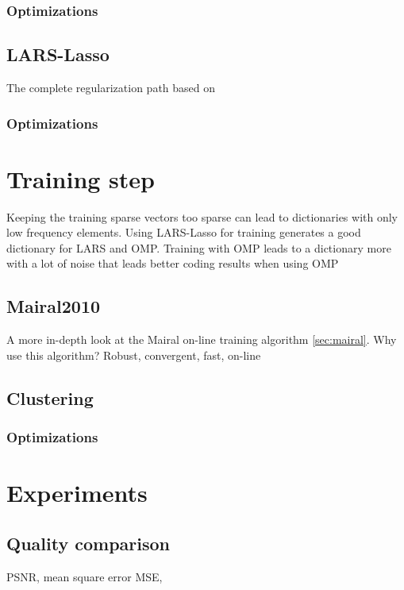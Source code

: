 \subsubsection*{Optimizations}


\subsection{LARS-Lasso}
The complete regularization path based on \cite{Efron2004}
\subsubsection*{Optimizations}


\section{Training step}
Keeping the training sparse vectors too sparse can lead to dictionaries with only low frequency elements.
Using LARS-Lasso for training generates a good dictionary for LARS and OMP. 
Training with OMP leads to a dictionary more with a lot of noise 
that leads better coding results when using OMP 

\subsection{Mairal2010}
A more in-depth look at the Mairal on-line training algorithm \ref{sec:mairal}. 
Why use this algorithm? Robust, convergent, fast, on-line


\subsection{Clustering}
\subsubsection*{Optimizations}




\section{Experiments}

\subsection{Quality comparison}
PSNR, mean square error MSE, 


